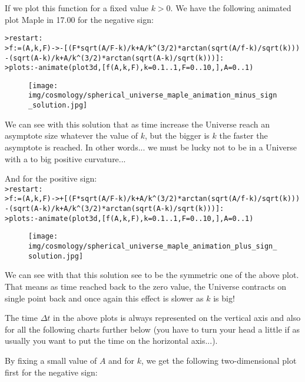 	If we plot this function for a fixed value $k>0$. We have the following  animated plot Maple in 17.00 for the negative sign:
	
	\texttt{>restart:\\
	>f:=(A,k,F)->-[(F*sqrt(A/F-k)/k+A/k\string^(3/2)*arctan(sqrt(A/f-k)/sqrt(k)))\\
	-(sqrt(A-k)/k+A/k\string^(3/2)*arctan(sqrt(A-k)/sqrt(k)))]:\\
	>plots:-animate(plot3d,[f(A,k,F),k=0.1..1,F=0..10,],A=0..1)
	}
	\begin{figure}[H]
		\begin{center}
		\texttt{[image: img/cosmology/spherical\_universe\_maple\_animation\_minus\_sign\_solution.jpg]}
		\end{center}
	\end{figure}
	We can see with this solution that as time increase the Universe reach an asymptote size whatever the value of $k$, but the bigger is $k$ the faster the asymptote is reached. In other words... we must be lucky not to be in a Universe with a to big positive curvature...
	
	And for the positive sign:\\
	
	\texttt{>restart:\\
	>f:=(A,k,F)->+[(F*sqrt(A/F-k)/k+A/k\string^(3/2)*arctan(sqrt(A/f-k)/sqrt(k)))\\
	-(sqrt(A-k)/k+A/k\string^(3/2)*arctan(sqrt(A-k)/sqrt(k)))]:\\
	>plots:-animate(plot3d,[f(A,k,F),k=0.1..1,F=0..10,],A=0..1)
	}
	\begin{figure}[H]
		\begin{center}
		\texttt{[image: img/cosmology/spherical\_universe\_maple\_animation\_plus\_sign\_solution.jpg]}
		\end{center}
	\end{figure}
	We can see with that this solution see to be the symmetric one of the above plot. That means as time reached back to the zero value, the Universe contracts on single point back and once again this effect is slower as $k$ is big! 
	
	\begin{tcolorbox}[title=Remark,colframe=black,arc=10pt]
	The time $\Delta t$ in the above plots is always represented on the vertical axis and also for all the following charts further below (you have to turn your head a little if as usually you want to put the time on the horizontal axis...).
	\end{tcolorbox}
	By fixing a small value of $A$ and for $k$, we get the following two-dimensional plot first for the negative sign:
	
